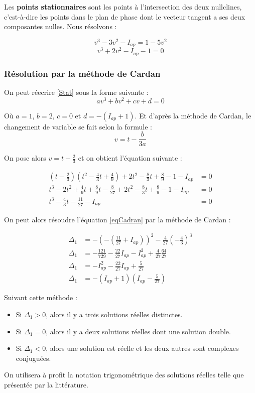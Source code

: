 \documentclass[12pt,a4paper,onecolumn]{article}
\begin{document}
Les \textbf{points stationnaires} sont les points à l'intersection des deux nullclines, c'est-à-dire les points dans le plan de phase dont le vecteur tangent a ses deux composantes nulles. Nous résolvons :

$$
v^3 - 3 v^2 - I_{ap} = 1-5v^2
$$
\begin{equation} \label{Stat}
v^3 + 2v^2 -I_{ap} -1 = 0
\end{equation}



\subsubsection{Résolution par la méthode de Cardan}
On peut réecrire \ref{Stat} sous la forme suivante :
\begin{equation*}
av^3 + b v^2 + cv + d = 0
\end{equation*}

Où $a = 1$, $b = 2$, $c = 0$ et $d = -(I_{ap} + 1)$.
Et d'après la méthode de Cardan, le changement de variable se fait selon la formule : $$ v=t-\frac{b}{3a} $$

On pose alors $v = t - \frac{2}{3}$ et on obtient l'équation suivante :

\begin{align}
\left(t - \frac{2}{3}\right)\left(t^2 - \frac{4}{3}t + \frac{4}{9}\right) + 2t^2 - \frac{8}{3}t + \frac{8}{9} - 1 - I_{ap} &= 0 \nonumber\\
t^3 - 2t^2 + \frac{4}{9}t + \frac{8}{9}t - \frac{8}{27} +2t^2 - \frac{8}{3}t + \frac{8}{9} - 1 - I_{ap} &= 0 \nonumber\\
t^3 - \frac{4}{3}t - \frac{11}{27} - I_{ap} &= 0 \label{eqCadran}
\end{align}

On peut alors résoudre l'équation \ref{eqCadran} par la méthode de Cardan :

\begin{align}
\Delta_1 &= -\left(-\left(\frac{11}{27} + I_{ap}\right)\right)^2 - \frac{4}{27}\left(-\frac{4}{3}\right)^3 \nonumber\\
\Delta_1 &= -\frac{121}{729} - \frac{22}{27}I_{ap} - I_{ap}^2 + \frac{4}{27}\frac{64}{27} \nonumber\\
\Delta_1 &= -I_{ap}^2 - \frac{22}{27}I_{ap} + \frac{5}{27} \nonumber\\
\Delta_1 &= -(I_{ap} + 1)(I_{ap} - \frac{5}{27})
\end{align}

Suivant cette méthode :
\begin{itemize}
\item Si $\Delta_1 > 0$, alors il y a trois solutions réelles distinctes.
\item Si $\Delta_1 = 0$, alors il y a deux solutions réelles dont une solution double.
\item Si $\Delta_1 < 0$, alors une solution est réelle et les deux autres sont complexes conjuguées.
\end{itemize}
On utilisera à profit la notation trigonométrique des solutions réelles telle que présentée par la littérature.
\end{document}
